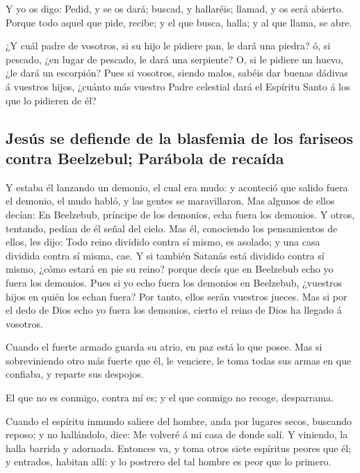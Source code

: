  Y yo os digo: Pedid, y se os dará; buscad, y hallaréis;
llamad, y os será abierto.  Porque todo aquel que pide,
recibe; y el que busca, halla; y al que llama, se abre.

 ¿Y cuál padre de vosotros, si su hijo le pidiere pan, le
dará una piedra? ó, si pescado, ¿en lugar de pescado, le dará una
serpiente?  O, si le pidiere un huevo, ¿le dará un
escorpión?  Pues si vosotros, siendo malos, sabéis dar
buenas dádivas á vuestros hijos, ¿cuánto más vuestro Padre celestial
dará el Espíritu Santo á los que lo pidieren de él?

\hypertarget{jesuxfas-se-defiende-de-la-blasfemia-de-los-fariseos-contra-beelzebul-paruxe1bola-de-recauxedda}{%
\subsection{Jesús se defiende de la blasfemia de los fariseos contra
Beelzebul; Parábola de
recaída}\label{jesuxfas-se-defiende-de-la-blasfemia-de-los-fariseos-contra-beelzebul-paruxe1bola-de-recauxedda}}

 Y estaba él lanzando un demonio, el cual era mudo: y
aconteció que salido fuera el demonio, el mudo habló, y las gentes se
maravillaron.  Mas algunos de ellos decían: En Beelzebub,
príncipe de los demonios, echa fuera los demonios.  Y
otros, tentando, pedían de él señal del cielo.  Mas él,
conociendo los pensamientos de ellos, les dijo: Todo reino dividido
contra sí mismo, es asolado; y una casa dividida contra sí misma, cae.
 Y si también Satanás está dividido contra sí mismo,
¿cómo estará en pie su reino? porque decís que en Beelzebub echo yo
fuera los demonios.  Pues si yo echo fuera los demonios
en Beelzebub, ¿vuestros hijos en quién los echan fuera? Por tanto, ellos
serán vuestros jueces.  Mas si por el dedo de Dios echo
yo fuera los demonios, cierto el reino de Dios ha llegado á vosotros.

 Cuando el fuerte armado guarda su atrio, en paz está lo
que posee.  Mas si sobreviniendo otro más fuerte que él,
le venciere, le toma todas sus armas en que confiaba, y reparte sus
despojos.

 El que no es conmigo, contra mí es; y el que conmigo no
recoge, desparrama.

 Cuando el espíritu inmundo saliere del hombre, anda por
lugares secos, buscando reposo; y no hallándolo, dice: Me volveré á mi
casa de donde salí.  Y viniendo, la halla barrida y
adornada.  Entonces va, y toma otros siete espíritus
peores que él; y entrados, habitan allí: y lo postrero del tal hombre es
peor que lo primero.

